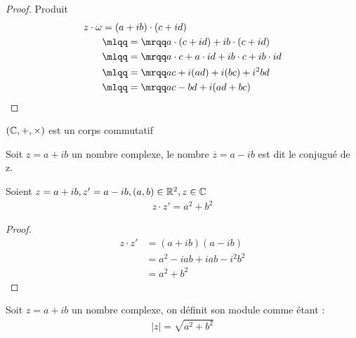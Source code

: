 \begin{proof}{Produit}
\begin{align*}
z \cdot \omega &= (a + ib) \cdot (c + id) \\
          &\mlqq=\mrqq a \cdot (c + id) + ib \cdot (c + id) \\
          &\mlqq=\mrqq a \cdot c + a \cdot id + ib \cdot c + ib \cdot id \\
          &\mlqq=\mrqq ac + i(ad) + i(bc) + i^2 bd \\
          &\mlqq=\mrqq ac - bd + i(ad + bc)
\end{align*}
\end{proof}


\begin{remarque}
    $(\mathbb{C}, +, \times)$ est un corps commutatif 
\end{remarque}



    \begin{definition}
    Soit $z = a + ib$ un nombre complexe, le nombre $\overline{z} = a - ib$ est dit le conjugué de z.
\end{definition}


\begin{proposition}{}
    Soient $z = a + ib, z'= a - ib, (a, b) \in \mathbb{R}^2, z \in \mathbb{C}$
    \begin{align*}
        z \cdot z' = a^2 + b^2 
    \end{align*}
\end{proposition}
\begin{proof}
        \begin{align*}
            z \cdot z' &= (a + ib)(a - ib) \\
                        &= a^2 -iab + iab -i^2b^2 \\
                        &= a^2 + b^2
        \end{align*}
    \end{proof}



    \begin{definition}
    Soit $z = a + ib$ un nombre complexe, on définit son module comme étant :
    \begin{align*}
        |z| = \sqrt{a^2 + b^2} 
    \end{align*}
\end{definition}


